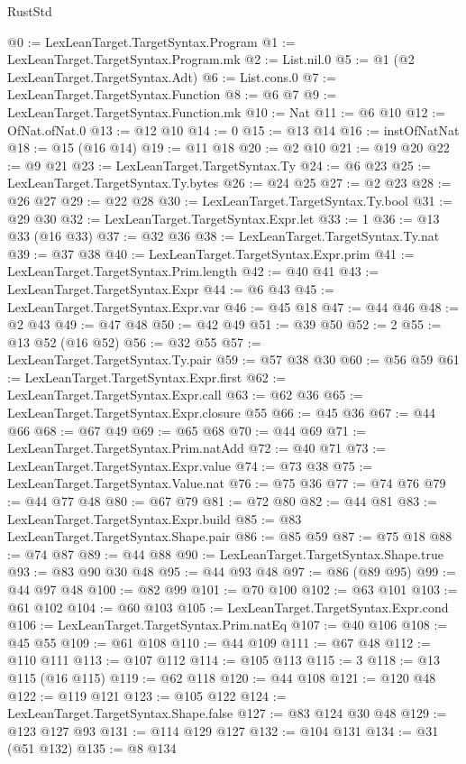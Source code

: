\begin{lexlean}{RustStd}
\begin{coremodule}
@0 := LexLeanTarget.TargetSyntax.Program
@1 := LexLeanTarget.TargetSyntax.Program.mk
@2 := List.nil.{0}
@5 := @1 (@2 LexLeanTarget.TargetSyntax.Adt)
@6 := List.cons.{0}
@7 := LexLeanTarget.TargetSyntax.Function
@8 := @6 @7
@9 := LexLeanTarget.TargetSyntax.Function.mk
@10 := Nat
@11 := @6 @10
@12 := OfNat.ofNat.{0}
@13 := @12 @10
@14 := 0
@15 := @13 @14
@16 := instOfNatNat
@18 := @15 (@16 @14)
@19 := @11 @18
@20 := @2 @10
@21 := @19 @20
@22 := @9 @21
@23 := LexLeanTarget.TargetSyntax.Ty
@24 := @6 @23
@25 := LexLeanTarget.TargetSyntax.Ty.bytes
@26 := @24 @25
@27 := @2 @23
@28 := @26 @27
@29 := @22 @28
@30 := LexLeanTarget.TargetSyntax.Ty.bool
@31 := @29 @30
@32 := LexLeanTarget.TargetSyntax.Expr.let
@33 := 1
@36 := @13 @33 (@16 @33)
@37 := @32 @36
@38 := LexLeanTarget.TargetSyntax.Ty.nat
@39 := @37 @38
@40 := LexLeanTarget.TargetSyntax.Expr.prim
@41 := LexLeanTarget.TargetSyntax.Prim.length
@42 := @40 @41
@43 := LexLeanTarget.TargetSyntax.Expr
@44 := @6 @43
@45 := LexLeanTarget.TargetSyntax.Expr.var
@46 := @45 @18
@47 := @44 @46
@48 := @2 @43
@49 := @47 @48
@50 := @42 @49
@51 := @39 @50
@52 := 2
@55 := @13 @52 (@16 @52)
@56 := @32 @55
@57 := LexLeanTarget.TargetSyntax.Ty.pair
@59 := @57 @38 @30
@60 := @56 @59
@61 := LexLeanTarget.TargetSyntax.Expr.first
@62 := LexLeanTarget.TargetSyntax.Expr.call
@63 := @62 @36
@65 := LexLeanTarget.TargetSyntax.Expr.closure @55
@66 := @45 @36
@67 := @44 @66
@68 := @67 @49
@69 := @65 @68
@70 := @44 @69
@71 := LexLeanTarget.TargetSyntax.Prim.natAdd
@72 := @40 @71
@73 := LexLeanTarget.TargetSyntax.Expr.value
@74 := @73 @38
@75 := LexLeanTarget.TargetSyntax.Value.nat
@76 := @75 @36
@77 := @74 @76
@79 := @44 @77 @48
@80 := @67 @79
@81 := @72 @80
@82 := @44 @81
@83 := LexLeanTarget.TargetSyntax.Expr.build
@85 := @83 LexLeanTarget.TargetSyntax.Shape.pair
@86 := @85 @59
@87 := @75 @18
@88 := @74 @87
@89 := @44 @88
@90 := LexLeanTarget.TargetSyntax.Shape.true
@93 := @83 @90 @30 @48
@95 := @44 @93 @48
@97 := @86 (@89 @95)
@99 := @44 @97 @48
@100 := @82 @99
@101 := @70 @100
@102 := @63 @101
@103 := @61 @102
@104 := @60 @103
@105 := LexLeanTarget.TargetSyntax.Expr.cond
@106 := LexLeanTarget.TargetSyntax.Prim.natEq
@107 := @40 @106
@108 := @45 @55
@109 := @61 @108
@110 := @44 @109
@111 := @67 @48
@112 := @110 @111
@113 := @107 @112
@114 := @105 @113
@115 := 3
@118 := @13 @115 (@16 @115)
@119 := @62 @118
@120 := @44 @108
@121 := @120 @48
@122 := @119 @121
@123 := @105 @122
@124 := LexLeanTarget.TargetSyntax.Shape.false
@127 := @83 @124 @30 @48
@129 := @123 @127 @93
@131 := @114 @129 @127
@132 := @104 @131
@134 := @31 (@51 @132)
@135 := @8 @134

\end{coremodule}
\end{lexlean}
